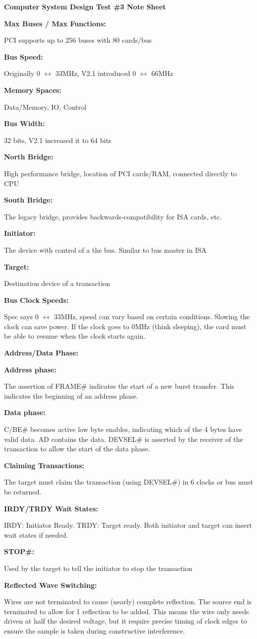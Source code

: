 \documentclass{article}
\newcommand{\ti}[1]{\hangindent=0.25in\noindent\begin{footnotesize}\textbf{#1:}\end{footnotesize}}
\newcommand{\hi}{\setlength\parindent{0.25in}\indent\hangindent=0.5in}
\newcommand{\lra}{$\leftrightarrow$ }
\begin{document}
	\begin{normalsize}
	\noindent \textbf{Computer System Design Test \#3 Note Sheet}
	\end{normalsize}
	
	\begin{footnotesize}
	\begin{multicols*}{2}
	
	\ti{Max Buses / Max Functions} PCI supports up to 256 buses with 80 cards/bus
	
	\ti{Bus Speed} Originally 0 \lra 33MHz, V2.1 introduced 0 \lra 66MHz
	
	\ti{Memory Spaces} Data/Memory, IO, Control
	
		\hi\ti{Bus Width} 32 bits, V2.1 increased it to 64 bits
	
	\ti{North Bridge} High performance bridge, location of PCI cards/RAM, connected directly to CPU
	
	\ti{South Bridge} The legacy bridge, provides backwards-compatibility for ISA cards, etc.
	
	\ti{Initiator} The device with control of a the bus. Similar to bus master in ISA
	
	\ti{Target} Destination device of a transaction
	
	\ti{Bus Clock Speeds} Spec says 0 \lra 33MHz, speed can vary based on certain conditions. Slowing the clock can save power. If the clock goes to 0MHz (think sleeping), the card must be able to resume when the clock starts again.
	
	\ti{Address/Data Phase}
	
		\hi\ti{Address phase} The assertion of FRAME\# indicates the start of a new burst transfer. This indicates the beginning of an address phase.
		
		\hi\ti{Data phase} C/BE\# becomes active low byte enables, indicating which of the 4 bytes have valid data. AD contains the data. DEVSEL\# is asserted by the receiver of the transaction to allow the start of the data phase.
	
		\hi\ti{Claiming Transactions} The target must claim the transaction (using DEVSEL\#) in 6 clocks or bus must be returned.
		
		\hi\ti{IRDY/TRDY Wait States} IRDY: Initiator Ready. TRDY: Target ready. Both initiator and target can insert wait states if needed.
		
		\hi\ti{STOP\#} Used by the target to tell the initiator to stop the transaction
		
	\ti{Reflected Wave Switching} Wires are not terminated to cause (nearly) complete reflection. The source end is terminated to allow for 1 reflection to be added. This means the wire only needs driven at half the desired voltage, but it require precise timing of clock edges to ensure the sample is taken during constructive interference.
	

\end{multicols*}
\end{footnotesize}
\end{document}
